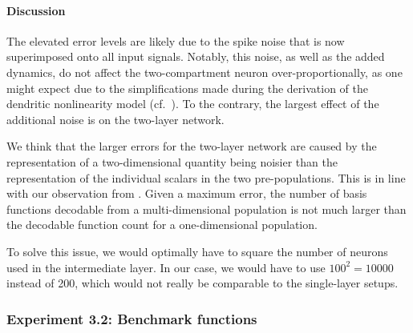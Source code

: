 \paragraph{Discussion}

The elevated error levels are likely due to the spike noise that is now superimposed onto all input signals.
Notably, this noise, as well as the added dynamics, do not affect the two-compartment neuron over-proportionally, as one might expect due to the simplifications made during the derivation of the dendritic nonlinearity model (cf.~).
To the contrary, the largest effect of the additional noise is on the two-layer network.

We think that the larger errors for the two-layer network are caused by the representation of a two-dimensional quantity being noisier than the representation of the individual scalars in the two pre-populations.
This is in line with our observation from .
Given a maximum error, the number of basis functions decodable from a multi-dimensional population is not much larger than the decodable function count for a one-dimensional population.

To solve this issue, we would optimally have to square the number of neurons used in the intermediate layer.
In our case, we would have to use $100^2 = \num{10000}$ instead of \num{200}, which would not really be comparable to the single-layer setups.

\subsubsection{Experiment 3.2: Benchmark functions}

